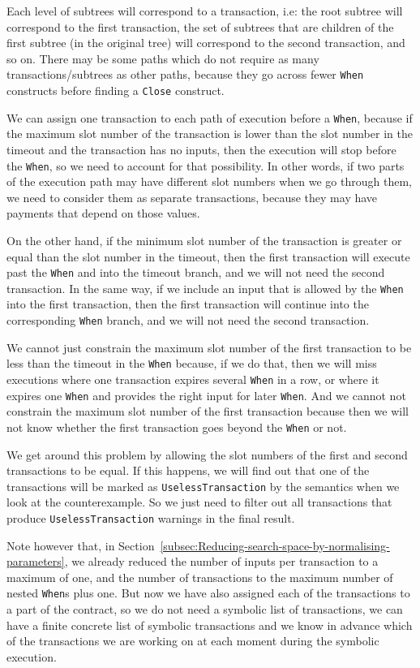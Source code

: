 \documentclass[english,runningheads]{llncs}
\begin{document}
Each level of subtrees will correspond to a transaction, i.e: the
root subtree will correspond to the first transaction, the set of
subtrees that are children of the first subtree (in the original tree)
will correspond to the second transaction, and so on. There may be
some paths which do not require as many transactions/subtrees as other
paths, because they go across fewer \texttt{When} constructs before
finding a \texttt{Close} construct.

We can assign one transaction to each path of execution before a \texttt{When},
because if the maximum slot number of the transaction is lower than
the slot number in the timeout and the transaction has no inputs,
then the execution will stop before the \texttt{When}, so we need
to account for that possibility. In other words, if two parts of the
execution path may have different slot numbers when we go through
them, we need to consider them as separate transactions, because they
may have payments that depend on those values.

On the other hand, if the minimum slot number of the transaction is greater
or equal than the slot number in the timeout, then the first transaction
will execute past the \texttt{When} and into the timeout branch, and
we will not need the second transaction. In the same way, if we include
an input that is allowed by the \texttt{When} into the first transaction,
then the first transaction will continue into the corresponding \texttt{When}
branch, and we will not need the second transaction.

We cannot just constrain the maximum slot number of the first transaction
to be less than the timeout in the \texttt{When} because, if we do
that, then we will miss executions where one transaction expires several
\texttt{When} in a row, or where it expires one \texttt{When} and provides
the right input for later \texttt{When}. And we cannot not constrain
the maximum slot number of the first transaction because then we will
not know whether the first transaction goes beyond the \texttt{When}
or not.

We get around this problem by allowing the slot numbers of the first
and second transactions to be equal. If this happens, we will find
out that one of the transactions will be marked as \texttt{UselessTransaction}
by the semantics when we look at the counterexample. So we just need
to filter out all transactions that produce \texttt{UselessTransaction}
warnings in the final result.

Note however that, in Section~\ref{subsec:Reducing-search-space-by-normalising-parameters},
we already reduced the number of inputs per transaction to a maximum
of one, and the number of transactions to the maximum number of nested
\texttt{When}s plus one. But now we have also assigned each of the
transactions to a part of the contract, so we do not need a symbolic
list of transactions, we can have a finite concrete list of symbolic
transactions and we know in advance which of the transactions we are
working on at each moment during the symbolic execution.
\end{document}
